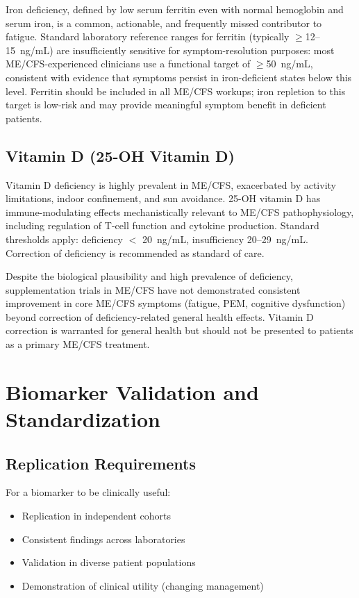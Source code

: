 Iron deficiency, defined by low serum ferritin even with normal hemoglobin and serum iron, is a common, actionable, and frequently missed contributor to fatigue. Standard laboratory reference ranges for ferritin (typically $\geq$12--15~ng/mL) are insufficiently sensitive for symptom-resolution purposes: most ME/CFS-experienced clinicians use a functional target of $\geq$50~ng/mL, consistent with evidence that symptoms persist in iron-deficient states below this level. Ferritin should be included in all ME/CFS workups; iron repletion to this target is low-risk and may provide meaningful symptom benefit in deficient patients.

\subsection{Vitamin D (25-OH Vitamin D)}

Vitamin D deficiency is highly prevalent in ME/CFS, exacerbated by activity limitations, indoor confinement, and sun avoidance. 25-OH vitamin D has immune-modulating effects mechanistically relevant to ME/CFS pathophysiology, including regulation of T-cell function and cytokine production. Standard thresholds apply: deficiency $<$ 20~ng/mL, insufficiency 20--29~ng/mL. Correction of deficiency is recommended as standard of care.

\begin{limitation}
Despite the biological plausibility and high prevalence of deficiency, supplementation trials in ME/CFS have not demonstrated consistent improvement in core ME/CFS symptoms (fatigue, PEM, cognitive dysfunction) beyond correction of deficiency-related general health effects. Vitamin D correction is warranted for general health but should not be presented to patients as a primary ME/CFS treatment.
\end{limitation}

\section{Biomarker Validation and Standardization}
\label{sec:biomarker-validation}

\subsection{Replication Requirements}

For a biomarker to be clinically useful:
\begin{itemize}
    \item Replication in independent cohorts
    \item Consistent findings across laboratories
    \item Validation in diverse patient populations
    \item Demonstration of clinical utility (changing management)
\end{itemize}


